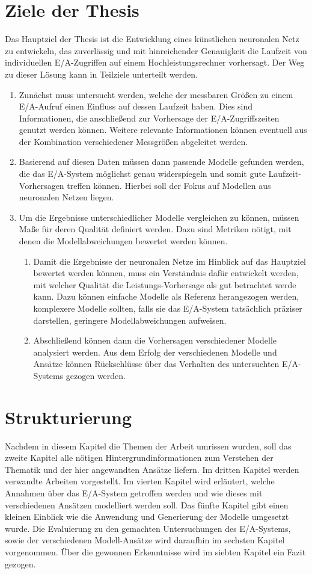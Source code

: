 \documentclass[
	12pt,
	a4paper,
	BCOR10mm,
	DIV14,
	listof=totoc,
	bibliography=totoc,
	headsepline
]{scrreprt}
\begin{document}
\section{Ziele der Thesis}
Das Hauptziel der Thesis ist die Entwicklung eines künstlichen neuronalen Netz zu entwickeln, das zuverlässig und mit hinreichender Genauigkeit die Laufzeit von individuellen E/A-Zugriffen auf einem Hochleistungsrechner vorhersagt. 
Der Weg zu dieser Lösung kann in Teilziele unterteilt werden.
\begin{enumerate}
	\item Zunächst muss untersucht werden, welche der messbaren Größen zu einem E/A-Aufruf einen Einfluss auf dessen Laufzeit haben. Dies sind Informationen, die anschließend zur Vorhersage der E/A-Zugriffszeiten genutzt werden können.
	Weitere relevante Informationen können eventuell aus der Kombination verschiedener Messgrößen abgeleitet werden.
	\item Basierend auf diesen Daten müssen dann passende Modelle gefunden werden, die das E/A-System möglichst genau widerspiegeln und somit gute Laufzeit-Vorhersagen treffen können. Hierbei soll der Fokus auf Modellen aus neuronalen Netzen liegen.
	\item Um die Ergebnisse unterschiedlicher Modelle vergleichen zu können, müssen Maße für deren Qualität definiert werden. Dazu sind Metriken nötigt, mit denen die Modellabweichungen bewertet werden können.
	\begin{enumerate}
		\item Damit die Ergebnisse der neuronalen Netze im Hinblick auf das Hauptziel bewertet werden können, muss ein Verständnis dafür entwickelt werden, mit welcher Qualität die Leistungs-Vorhersage als gut betrachtet werde kann.
		Dazu können einfache Modelle als Referenz herangezogen werden, komplexere Modelle sollten, falls sie das E/A-System tatsächlich präziser darstellen, geringere Modellabweichungen aufweisen.
		\item Abschließend können dann die Vorhersagen verschiedener Modelle analysiert werden. Aus dem Erfolg der verschiedenen Modelle und Ansätze können Rückschlüsse über das Verhalten des untersuchten E/A-Systems gezogen werden.
	\end{enumerate}
\end{enumerate}

\section{Strukturierung}
Nachdem in diesem Kapitel die Themen der Arbeit umrissen wurden, soll das zweite Kapitel alle nötigen Hintergrundinformationen zum Verstehen der Thematik und der hier angewandten Ansätze liefern. Im dritten Kapitel werden verwandte Arbeiten vorgestellt.
Im vierten Kapitel wird erläutert, welche Annahmen über das E/A-System getroffen werden und wie dieses mit verschiedenen Ansätzen modelliert werden soll.
Das fünfte Kapitel gibt einen kleinen Einblick wie die Anwendung und Generierung der Modelle umgesetzt wurde.
Die Evaluierung zu den gemachten Untersuchungen des E/A-Systems, sowie der verschiedenen Modell-Ansätze wird daraufhin im sechsten Kapitel vorgenommen.
Über die gewonnen Erkenntnisse wird im siebten Kapitel ein Fazit gezogen.
\bigskip
\end{document}
